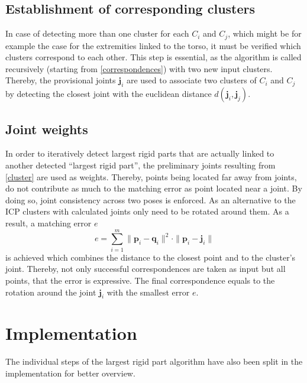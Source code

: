 \subsection{Establishment of corresponding clusters}
\label{CorrespondingClusters}
In case of detecting more than one cluster for each $C_i$ and $C_j$, which might be for example the case for the extremities linked to the torso, it must be verified which clusters correspond to each other. This step is essential, as the algorithm is called recursively (starting from \ref{correspondences}) with two new input clusters. Thereby, the provisional joints $\boldsymbol{j}_i$ are used to associate two clusters of $C_i$ and $C_j$ by detecting the closest joint with the euclidean distance $d(\boldsymbol{j}_i,\boldsymbol{j}_j)$.

\subsection{Joint weights}
\label{JointWeights}
In order to iteratively detect largest rigid parts that are actually linked to another detected ``largest rigid part'', the preliminary joints resulting from \ref{cluster} are used as weights. Thereby, points being located far away from joints, do not contribute as much to the matching error as point located near a joint. By doing so, joint consistency across two poses is enforced. As an alternative to the ICP clusters with calculated joints only need to be rotated around them. As a result, a matching error $e$ 
%
\begin{equation}
	e = \displaystyle\sum_{i=1}^{m}\| \boldsymbol{p}_i - \boldsymbol{q}_i\|^2 \cdot \| \boldsymbol{p}_i - \boldsymbol{j}_i\|
\end{equation}
%
is achieved which combines the distance to the closest point and to the cluster's joint. Thereby, not only successful correspondences are taken as input but all points, that the error is expressive. The final correspondence equals to the rotation around the joint $\boldsymbol{j}_i$ with the smallest error $e$. 

\section{Implementation}
\label{ImplementationLRP}
The individual steps of the largest rigid part algorithm have also been split in the implementation for better overview. 
%
%
